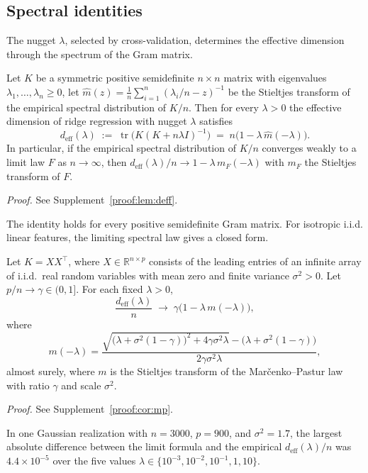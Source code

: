 \subsection{Spectral identities}
\label{sec:theory-rmt}

The nugget $\lambda$, selected by cross-validation, determines the
effective dimension through the spectrum of the Gram matrix.

\begin{lemma}
\label{lem:deff}
Let $K$ be a symmetric positive semidefinite $n\times n$ matrix with
eigenvalues $\lambda_1,\dots,\lambda_n\ge0$, let
$\widehat m(z)=\tfrac1n\sum_{i=1}^n(\lambda_i/n-z)^{-1}$ be the Stieltjes
transform of the empirical spectral distribution of $K/n$. Then for every
$\lambda>0$ the effective dimension of ridge regression with nugget $\lambda$
satisfies
\[
d_{\mathrm{eff}}(\lambda)\;:=\;\operatorname{tr}\!\big(K(K+n\lambda I)^{-1}\big)
\;=\;n\big(1-\lambda\,\widehat m(-\lambda)\big).
\]
In particular, if the empirical spectral distribution of $K/n$ converges
weakly to a limit law $F$ as $n\to\infty$, then
$d_{\mathrm{eff}}(\lambda)/n\to 1-\lambda\,m_F(-\lambda)$ with $m_F$ the
Stieltjes transform of $F$.
\end{lemma}
\noindent\emph{Proof.} See Supplement~\ref{proof:lem:deff}.


The identity holds for every positive semidefinite Gram matrix. For
isotropic i.i.d. linear features, the limiting spectral law gives a closed form.

\begin{corollary}
\label{cor:mp}
Let $K=XX^\top$, where $X\in\mathbb R^{n\times p}$ consists of the leading
entries of an infinite array of i.i.d.\ real random variables with mean zero
and finite variance $\sigma^2>0$. Let $p/n\to\gamma\in(0,1]$. For each fixed
$\lambda>0$,
\[
\frac{d_{\mathrm{eff}}(\lambda)}{n}\;\longrightarrow\;
\gamma\big(1-\lambda\,m(-\lambda)\big),
\]
where
\[
m(-\lambda)=\frac{\sqrt{\big(\lambda+\sigma^2(1-\gamma)\big)^2+4\gamma\sigma^2\lambda}
-\big(\lambda+\sigma^2(1-\gamma)\big)}{2\gamma\sigma^2\lambda},
\]
almost surely, where $m$ is the Stieltjes transform of the
Mar\v{c}enko--Pastur law with ratio $\gamma$ and scale $\sigma^2$.
\end{corollary}
\noindent\emph{Proof.} See Supplement~\ref{proof:cor:mp}.

In one Gaussian realization with $n=3000$, $p=900$, and $\sigma^2=1.7$, the
largest absolute difference between the limit formula and the empirical
$d_{\mathrm{eff}}(\lambda)/n$ was $4.4\times10^{-5}$ over the five values
$\lambda\in\{10^{-3},10^{-2},10^{-1},1,10\}$.

